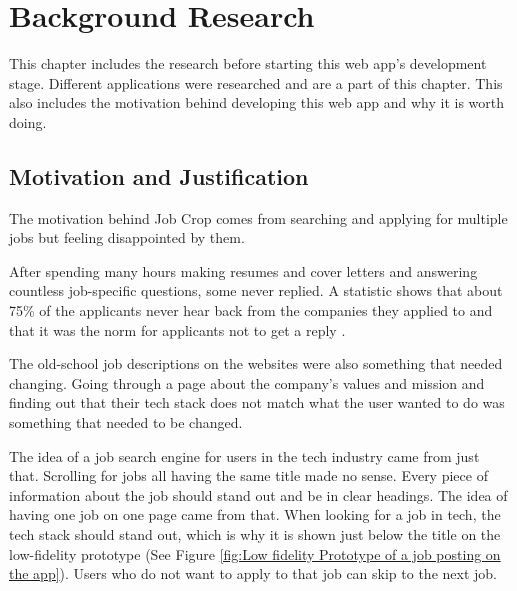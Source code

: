 
\chapter{Background Research} %

\label{Chapter2} %


This chapter includes the research before starting this web app's development stage. Different applications were researched and are a part of this chapter. This also includes the motivation behind developing this web app and why it is worth doing. 

\section{Motivation and Justification}
The motivation behind Job Crop comes from searching and applying for multiple jobs but feeling disappointed by them. 

After spending many hours making resumes and cover letters and answering countless job-specific questions,  some never replied. A statistic shows that about 75\% of the applicants never hear back from the companies they applied to and that it was the norm for applicants not to get a reply \parencite{Reference19}.

The old-school job descriptions on the websites were also something that needed changing. Going through a page about the company's values and mission and finding out that their tech stack does not match what the user wanted to do was something that needed to be changed.

The idea of a job search engine for users in the tech industry came from just that. Scrolling for jobs all having the same title made no sense. Every piece of information about the job should stand out and be in clear headings. The idea of having one job on one page came from that. When looking for a job in tech, the tech stack should stand out, which is why it is shown just below the title on the low-fidelity prototype (See Figure \ref{fig:Low fidelity Prototype of a job posting on the app}). Users who do not want to apply to that job can skip to the next job. 

